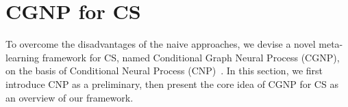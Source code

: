 \section{CGNP for CS}
\label{sec:metric}




To overcome the disadvantages of the naive approaches, 
we devise a novel meta-learning framework for CS, named Conditional Graph Neural Process (CGNP), on the basis of Conditional Neural Process (CNP)~\cite{CNP}.
In this section, we first introduce CNP as a preliminary, then present the core idea of CGNP for CS as an overview of our framework.


